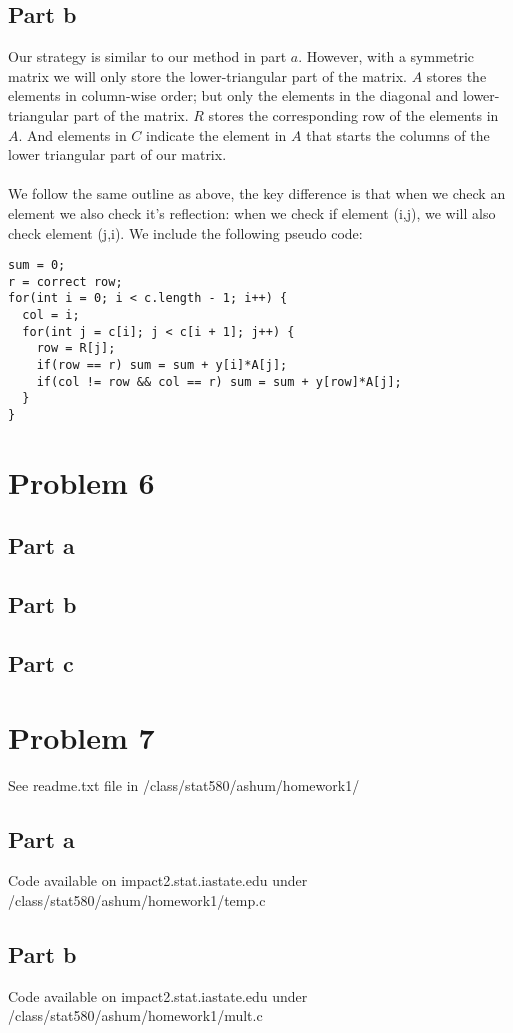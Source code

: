 \documentclass{article}\usepackage[]{graphicx}\usepackage[]{color}
\begin{document}
\subsection*{Part b}
Our strategy is similar to our method in part $a$.  However, with a symmetric matrix we will only store the lower-triangular part of the matrix.  $A$ stores the elements in column-wise order; but only the elements in the diagonal and lower-triangular part of the matrix.  $R$ stores the corresponding row of the elements in $A$.  And elements in $C$ indicate the element in $A$ that starts the columns of the lower triangular part of our matrix.\\
\\
We follow the same outline as above, the key difference is that when we check an element we also check it's reflection: when we check if element (i,j), we will also check element (j,i).  We include the following pseudo code:
\begin{verbatim}
sum = 0;
r = correct row;
for(int i = 0; i < c.length - 1; i++) {
  col = i;
  for(int j = c[i]; j < c[i + 1]; j++) {
    row = R[j];
    if(row == r) sum = sum + y[i]*A[j];
    if(col != row && col == r) sum = sum + y[row]*A[j];
  }
}
\end{verbatim}


\section*{Problem 6}
\subsection*{Part a}


\subsection*{Part b}


\subsection*{Part c}


\section*{Problem 7}
See readme.txt file in /class/stat580/ashum/homework1/
\subsection*{Part a}
Code available on impact2.stat.iastate.edu under /class/stat580/ashum/homework1/temp.c
\subsection*{Part b}
Code available on impact2.stat.iastate.edu under /class/stat580/ashum/homework1/mult.c
\end{document}
